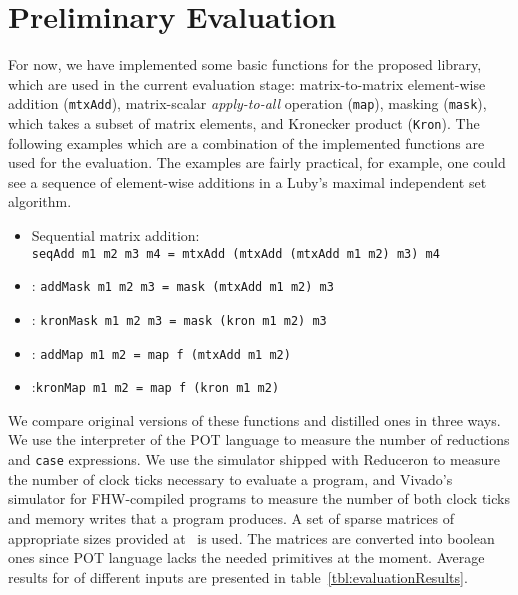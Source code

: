 \section{Preliminary Evaluation}

For now, we have implemented some basic functions for the proposed library, which are used in the current evaluation stage: matrix-to-matrix element-wise addition (\verb|mtxAdd|),
matrix-scalar \emph{apply-to-all} operation (\verb|map|),
masking (\verb|mask|), which takes a subset of matrix elements, and Kronecker product (\verb|Kron|).
The following examples which are a combination of the implemented functions are used for the evaluation. The examples are fairly practical, for example, one could see a sequence of element-wise additions in a Luby's maximal independent set algorithm.

\begin{itemize}
\item Sequential matrix addition:\\
  \verb|seqAdd m1 m2 m3 m4 = mtxAdd (mtxAdd (mtxAdd m1 m2) m3) m4|
\item {}: \verb|addMask m1 m2 m3 = mask (mtxAdd m1 m2) m3|
\item {}: \verb|kronMask m1 m2 m3 = mask (kron m1 m2) m3 |  
\item {}: \verb|addMap m1 m2 = map f (mtxAdd m1 m2)|  
\item {}:\verb|kronMap m1 m2 = map f (kron m1 m2)|  
\end{itemize}

We compare original versions of these functions and distilled ones in three ways.
We use the interpreter of the POT language to measure the number of reductions and  \verb|case| expressions.
We use the simulator shipped with Reduceron to measure the number of clock ticks necessary to evaluate a program, and Vivado's simulator for FHW-compiled programs to measure the number of both clock ticks and memory writes that a program produces.
A set of sparse matrices of appropriate sizes provided at~\cite{Matrices} is used. 
The matrices are converted into boolean ones since POT language lacks the needed primitives at the moment.
Average results for  of different inputs are presented in table~\ref{tbl:evaluationResults}.

